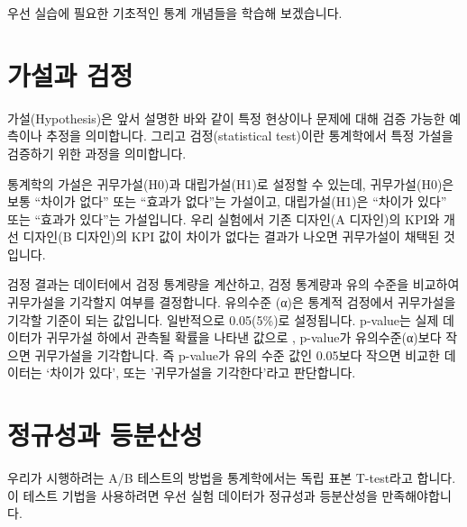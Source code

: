 \documentclass[
  letterpaper,
]{book}
\begin{document}
우선 실습에 필요한 기초적인 통계 개념들을 학습해 보겠습니다.

\section{가설과 검정}\label{uxac00uxc124uxacfc-uxac80uxc815}

가설(Hypothesis)은 앞서 설명한 바와 같이 특정 현상이나 문제에 대해 검증
가능한 예측이나 추정을 의미합니다. 그리고 검정(statistical test)이란
통계학에서 특정 가설을 검증하기 위한 과정을 의미합니다.

통계학의 가설은 귀무가설(H0)과 대립가설(H1)로 설정할 수 있는데,
귀무가설(H0)은 보통 ``차이가 없다'' 또는 ``효과가 없다''는 가설이고,
대립가설(H1)은 ``차이가 있다'' 또는 ``효과가 있다''는 가설입니다. 우리
실험에서 기존 디자인(A 디자인)의 KPI와 개선 디자인(B 디자인)의 KPI 값이
차이가 없다는 결과가 나오면 귀무가설이 채택된 것입니다.

검정 결과는 데이터에서 검정 통계량을 계산하고, 검정 통계량과 유의 수준을
비교하여 귀무가설을 기각할지 여부를 결정합니다. 유의수준 (α)은 통계적
검정에서 귀무가설을 기각할 기준이 되는 값입니다. 일반적으로 0.05(5\%)로
설정됩니다. p-value는 실제 데이터가 귀무가설 하에서 관측될 확률을 나타낸
값으로 , p-value가 유의수준(α)보다 작으면 귀무가설을 기각합니다. 즉
p-value가 유의 수준 값인 0.05보다 작으면 비교한 데이터는 `차이가 있다',
또는 '귀무가설을 기각한다'라고 판단합니다.

\section{정규성과
등분산성}\label{uxc815uxaddcuxc131uxacfc-uxb4f1uxbd84uxc0b0uxc131}

우리가 시행하려는 A/B 테스트의 방법을 통계학에서는 독립 표본 T-test라고
합니다. 이 테스트 기법을 사용하려면 우선 실험 데이터가 정규성과
등분산성을 만족해야합니다.
\end{document}
